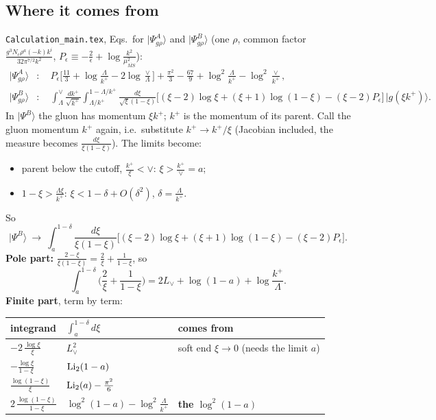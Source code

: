 \documentclass[10pt]{article}
\numberwithin{equation}{section}
\newcommand{\Lv}{L_{\vee}}
\begin{document}
\subsection{Where it comes from}\label{sec:origin}
\texttt{Calculation\_main.tex}, Eqs.~for $|\Psi^A_{g\rho}\rangle$ and $|\Psi^B_{g\rho}\rangle$ (one $\rho$, common factor $\frac{g^3N_c\rho^a(-k)k^i}{32\pi^{7/2}k^2}$, $P_\epsilon\equiv-\frac2\epsilon+\log\frac{k^2}{\mu^2_{\overline{MS}}}$):
\begin{align*}
|\Psi^A_{g\rho}\rangle&:\quad P_\epsilon\Big[\frac{11}{3}+\log\frac{\Lambda}{k^+}-2\log\frac{\vee}{\Lambda}\Big]+\frac{\pi^2}{3}-\frac{67}{9}+\log^2\frac{\Lambda}{k^+}-\log^2\frac{\vee}{k^+},\\
|\Psi^B_{g\rho}\rangle&:\quad\int_\Lambda^\vee\frac{dk^+}{\sqrt{k^+}}\int_{\Lambda/k^+}^{1-\Lambda/k^+}\frac{d\xi}{\sqrt\xi(1-\xi)}\Big[(\xi-2)\log\xi+(\xi+1)\log(1-\xi)-(\xi-2)P_\epsilon\Big]\,|g(\xi k^+)\rangle.
\end{align*}
In $|\Psi^B\rangle$ the gluon has momentum $\xi k^+$; $k^+$ is the momentum of its parent. Call the gluon momentum $k^+$ again, i.e.\ substitute $k^+\to k^+/\xi$ (Jacobian included, the measure becomes $\frac{d\xi}{\xi(1-\xi)}$). The limits become:
\begin{itemize}
\item parent below the cutoff, $\frac{k^+}{\xi}<\vee$: \quad $\xi>\frac{k^+}{\vee}=a$;
\item $1-\xi>\frac{\Lambda\xi}{k^+}$: \quad $\xi<1-\delta+O(\delta^2)$, $\delta=\frac\Lambda{k^+}$.
\end{itemize}
So
\begin{equation}
|\Psi^B\rangle\ \to\ \int_a^{1-\delta}\frac{d\xi}{\xi(1-\xi)}\Big[(\xi-2)\log\xi+(\xi+1)\log(1-\xi)-(\xi-2)P_\epsilon\Big].
\label{eq:psiB}
\end{equation}
\textbf{Pole part:} $\frac{2-\xi}{\xi(1-\xi)}=\frac2\xi+\frac1{1-\xi}$, so
\begin{equation*}
\int_a^{1-\delta}\Big(\frac2\xi+\frac{1}{1-\xi}\Big)=2\Lv+\log(1-a)+\log\frac{k^+}{\Lambda}.
\end{equation*}
\textbf{Finite part}, term by term:
\begin{center}\small
\begin{tabular}{@{}lll@{}}\toprule
integrand & $\int_a^{1-\delta}d\xi$ & comes from\\\midrule
$-2\,\frac{\log\xi}{\xi}$ & $\Lv^2$ & soft end $\xi\to0$ (needs the limit $a$)\\
$-\frac{\log\xi}{1-\xi}$ & ${\rm Li}_2(1-a)$ & \\
$\frac{\log(1-\xi)}{\xi}$ & ${\rm Li}_2(a)-\frac{\pi^2}{6}$ & \\
$2\,\frac{\log(1-\xi)}{1-\xi}$ & $\log^2(1-a)-\log^2\frac{\Lambda}{k^+}$ & \textbf{the $\log^2(1-a)$}\\\bottomrule
\end{tabular}
\end{center}
\end{document}
